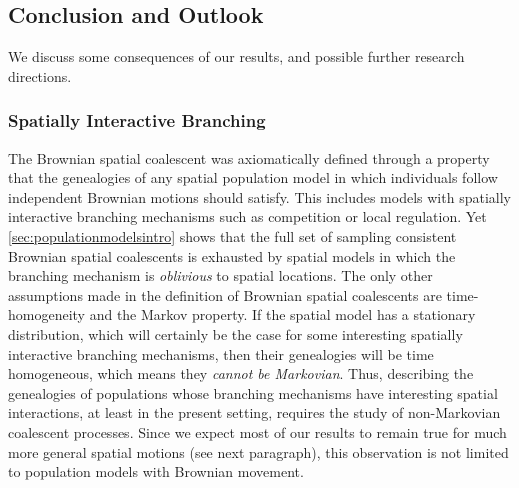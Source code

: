 \documentclass[reqno,draft]{amsart}
\numberwithin{equation}{section}
\theoremstyle{plain}
\theoremstyle{remark}
\begin{document}

\subsection{Conclusion and Outlook}\label{sec:conclusion}

We discuss some consequences of our results, and possible further research directions.

\subsubsection{Spatially Interactive Branching}\label{sec:interactivebranching}
The Brownian spatial coalescent was axiomatically defined through a property that the genealogies of any spatial population model in which individuals follow independent Brownian motions should satisfy. This includes models with spatially interactive branching mechanisms such as competition or local regulation.
Yet \cref{sec:populationmodelsintro} shows that the full set of sampling consistent Brownian spatial coalescents is exhausted by spatial models in which the branching mechanism is \emph{oblivious} to spatial locations. The only other assumptions made in the definition of Brownian spatial coalescents are time-homogeneity and the Markov property. If the spatial model has a stationary distribution, which will certainly be the case for some interesting spatially interactive branching mechanisms, then their genealogies will be time homogeneous, which means they \emph{cannot be Markovian}. Thus, describing the genealogies of populations whose branching mechanisms have interesting spatial interactions, at least in the present setting, requires the study of non-Markovian coalescent processes. Since we expect most of our results to remain true for much more general spatial motions (see next paragraph), this observation is not limited to population models with Brownian movement.
\end{document}

